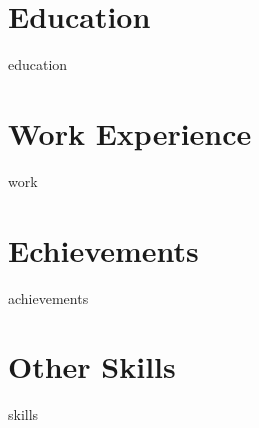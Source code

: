 \documentclass[a4paper, skipsamekey, 11pt, german]{cv}
\begin{document}
\maketitle

\section{\faGraduationCap \hspace{1em} Education}{education}
\section{\faBriefcase \hspace{1em} Work Experience}{work}
\section{\faTrophy \hspace{1em} Echievements}{achievements}
\section{\faStar \hspace{1em} Other Skills}{skills}
\end{document}
